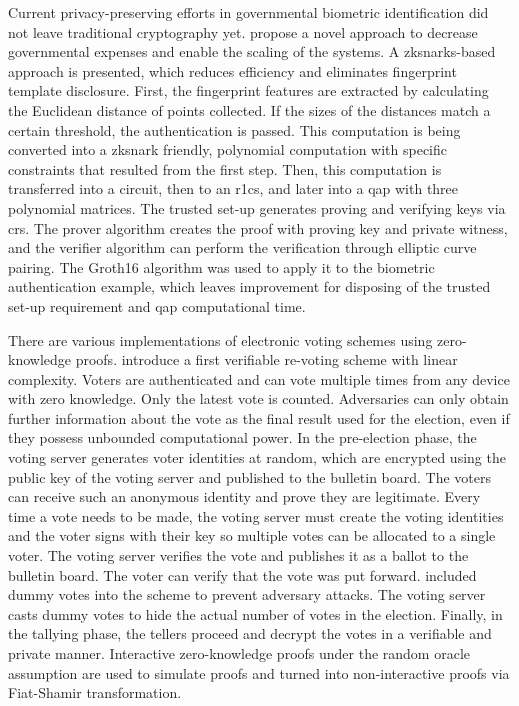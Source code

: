 Current privacy-preserving efforts in governmental biometric identification did not leave traditional cryptography yet. \citet{Guo} propose a novel approach to decrease governmental expenses and enable the scaling of the systems. A \acrshort{zksnark}s-based approach is presented, which reduces efficiency and eliminates fingerprint template disclosure. First, the fingerprint features are extracted by calculating the Euclidean distance of points collected. If the sizes of the distances match a certain threshold, the authentication is passed. This computation is being converted into a \acrshort{zksnark} friendly, polynomial computation with specific constraints that resulted from the first step. Then, this computation is transferred into a circuit, then to an \acrshort{r1cs}, and later into a \acrshort{qap} with three polynomial matrices. The trusted set-up generates proving and verifying keys via \acrshort{crs}. The prover algorithm creates the proof with proving key and private witness, and the verifier algorithm can perform the verification through elliptic curve pairing. The Groth16 algorithm was used to apply it to the biometric authentication example, which leaves improvement for disposing of the trusted set-up requirement and \acrshort{qap} computational time.

There are various implementations of electronic voting schemes using zero-knowledge proofs. \citet{Querejeta} introduce a first verifiable re-voting scheme with linear complexity. Voters are authenticated and can vote multiple times from any device with zero knowledge. Only the latest vote is counted. Adversaries can only obtain further information about the vote as the final result used for the election, even if they possess unbounded computational power. In the pre-election phase, the voting server generates voter identities at random, which are encrypted using the public key of the voting server and published to the bulletin board. The voters can receive such an anonymous identity and prove they are legitimate. Every time a vote needs to be made, the voting server must create the voting identities and the voter signs with their key so multiple votes can be allocated to a single voter. The voting server verifies the vote and publishes it as a ballot to the bulletin board. The voter can verify that the vote was put forward. \citet{Querejeta} included dummy votes into the scheme to prevent adversary attacks. The voting server casts dummy votes to hide the actual number of votes in the election. Finally, in the tallying phase, the tellers proceed and decrypt the votes in a verifiable and private manner. Interactive zero-knowledge proofs under the random oracle assumption are used to simulate proofs and turned into non-interactive proofs via Fiat-Shamir transformation.

